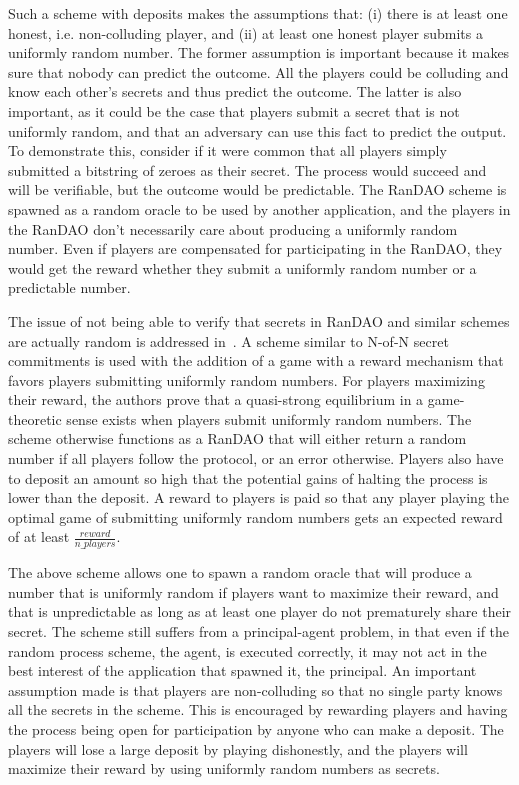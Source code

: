 Such a scheme with deposits makes the assumptions that: (i) there is at least one honest, i.e. non-colluding player, and (ii) at least one honest player submits a uniformly random number. The former assumption is important because it makes sure that nobody can predict the outcome. All the players could be colluding and know each other's secrets and thus predict the outcome. The latter is also important, as it could be the case that players submit a secret that is not uniformly random, and that an adversary can use this fact to predict the output. To demonstrate this, consider if it were common that all players simply submitted a bitstring of zeroes as their secret. The process would succeed and will be verifiable, but the outcome would be predictable. The RanDAO scheme is spawned as a random oracle to be used by another application, and the players in the RanDAO don't necessarily care about producing a uniformly random number. Even if players are compensated for participating in the RanDAO, they would get the reward whether they submit a uniformly random number or a predictable number.

The issue of not being able to verify that secrets in RanDAO and similar schemes are actually random is addressed in~\cite{chatterjee_probabilistic_2019}. A scheme similar to N-of-N secret commitments is used with the addition of a game with a reward mechanism that favors players submitting uniformly random numbers. For players maximizing their reward, the authors prove that a quasi-strong equilibrium in a game-theoretic sense exists when players submit uniformly random numbers. The scheme otherwise functions as a RanDAO that will either return a random number if all players follow the protocol, or an error otherwise. Players also have to deposit an amount so high that the potential gains of halting the process is lower than the deposit. A reward to players is paid so that any player playing the optimal game of submitting uniformly random numbers gets an expected reward of at least $\frac{reward}{n\_players}$. 

The above scheme allows one to spawn a random oracle that will produce a number that is uniformly random if players want to maximize their reward, and that is unpredictable as long as at least one player do not prematurely share their secret. The scheme still suffers from a principal-agent problem, in that even if the random process scheme, the agent, is executed correctly, it may not act in the best interest of the application that spawned it, the principal. An important assumption made is that players are non-colluding so that no single party knows all the secrets in the scheme. This is encouraged by rewarding players and having the process being open for participation by anyone who can make a deposit. The players will lose a large deposit by playing dishonestly, and the players will maximize their reward by using uniformly random numbers as secrets.

